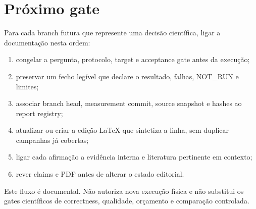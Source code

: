 \section{Próximo gate}
Para cada branch futura que represente uma decisão científica, ligar a documentação nesta ordem:

\begin{enumerate}
\item congelar a pergunta, protocolo, target e acceptance gate antes da execução;
\item preservar um fecho legível que declare o resultado, falhas, NOT\_RUN e limites;
\item associar branch head, measurement commit, source snapshot e hashes ao report registry;
\item atualizar ou criar a edição LaTeX que sintetiza a linha, sem duplicar campanhas já cobertas;
\item ligar cada afirmação a evidência interna e literatura pertinente em contexto;
\item rever claims e PDF antes de alterar o estado editorial.
\end{enumerate}

Este fluxo é documental. Não autoriza nova execução física e não substitui os gates científicos de correctness, qualidade, orçamento e comparação controlada.
